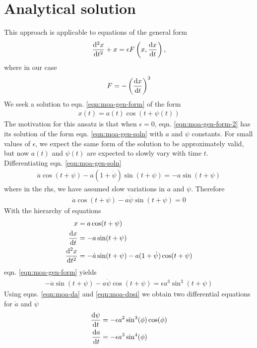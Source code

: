 \section*{Analytical solution}
This approach is applicable to equations of the general form
\begin{gather}\label{eqn:moa-gen-form-2}
	\frac{\mathrm{d}^2 x}{\mathrm{d} t^2} + x = \epsilon F \left(x,\frac{\mathrm{d} x}{\mathrm{d} t}\right) ,
\end{gather}
where in our case
\begin{gather*}
	F = -\left(\frac{\mathrm{d} x}{\mathrm{d} t}\right)^3
\end{gather*}
We seek a solution to eqn. \ref{eqn:moa-gen-form} of the form
\begin{gather}\label{eqn:moa-gen-soln}
	x(t) = a(t) \cos \left(t+\psi(t)\right)
\end{gather}
The motivation for this ansatz is that when $\epsilon=0$, eqn. \ref{eqn:moa-gen-form-2} has its solution of the form eqn. \ref{eqn:moa-gen-soln} with $a$ and $\psi$ constants. For small values of $\epsilon$, we expect the same form of the solution to be approximately valid, but now $a(t)$ and $\psi(t)$ are expected to slowly vary with time $t$. Differentiating eqn. \ref{eqn:moa-gen-soln}
\begin{gather*}
	\dot{a} \cos(t+\psi) - a (1+\dot{\psi}) \sin(t+\psi) = -a \sin (t+\psi) 
\end{gather*}
where in the rhs, we have assumed slow variations in $a$ and $\psi$. Therefore
\begin{gather}\label{eqn:moa-da}
	\dot{a} \cos(t+\psi) - a \dot{\psi} \sin(t+\psi) = 0
\end{gather}
With the hierarchy of equations
\begin{align*}
	x &= a \cos (t+\psi) \\
	\frac{\mathrm{d} x}{\mathrm{d} t} &= -a \sin (t+\psi) \\
	\frac{\mathrm{d}^2 x}{\mathrm{d} t^2} &= -\dot{a} \sin(t+\psi) - a (1+\dot{\psi}) \cos(t+\psi)
\end{align*}
eqn. \ref{eqn:moa-gen-form} yields
\begin{gather}\label{eqn:moa-dpsi}
	-\dot{a} \sin(t+\psi) - a \dot{\psi} \cos(t+\psi) = \epsilon a^3 \sin^3 (t+\psi)
\end{gather}
Using eqns. \ref{eqn:moa-da} and \ref{eqn:moa-dpsi} we obtain two differential equations for $\dot{a}$ and $\dot{\psi}$
\begin{align*}
	\frac{\mathrm{d} \psi}{\mathrm{d} t} &= -\epsilon a^2 \sin^3 (\phi) \cos (\phi)\\
	\frac{\mathrm{d} a}{\mathrm{d} t} &= -\epsilon a^3 \sin^4(\phi)
\end{align*}
